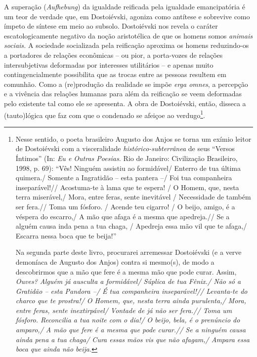 A superação (\emph{Aufhebung}) da igualdade reificada pela igualdade
emancipatória é um teor de verdade que, em Dostoiévski, agoniza como
antítese e sobrevive como ímpeto de síntese em meio ao subsolo.
Dostoiévski nos revela o caráter escatologicamente negativo da noção
aristotélica de que os homens somos \emph{animais sociais.} A sociedade
socializada pela reificação aproxima os homens reduzindo-os a portadores
de relações econômicas -- ou pior, a porta-vozes de relações
intersubjetivas deformadas por interesses utilitários -- e apenas muito
contingencialmente possibilita que as trocas entre as pessoas resultem
em comunhão. Como a (re)produção da realidade se impõe \emph{erga
omnes}, a percepção e a vivência das relações humanas para além da
reificação se veem deformadas pelo existente tal como ele se apresenta.
A obra de Dostoiévski, então, disseca a (tauto)lógica que faz com que o
condenado se afeiçoe ao verdugo\footnote{Nesse sentido, o poeta
  brasileiro Augusto dos Anjos se torna um exímio leitor de Dostoiévski
  com a visceralidade \emph{histórico-subterrânea} de seus ``Versos
  Íntimos'' (In: \emph{Eu e Outras Poesias.} Rio de Janeiro: Civilização
  Brasileiro, 1998, p. 69): ``Vês! Ninguém assistiu ao formidável/
  Enterro de tua última quimera./ Somente a Ingratidão -- esta pantera
  --/ Foi tua companheira inseparável!// Acostuma-te à lama que te
  espera! / O Homem, que, nesta terra miserável,/ Mora, entre feras,
  sente inevitável / Necessidade de também ser fera.// Toma um fósforo.
  / Acende teu cigarro! / O beijo, amigo, é a véspera do escarro,/ A mão
  que afaga é a mesma que apedreja.// Se a alguém causa inda pena a tua
  chaga, / Apedreja essa mão vil que te afaga,/ Escarra nessa boca que
  te beija!''

  Na segunda parte deste livro, procurarei arremessar Dostoiévski (e a
  verve demoníaca de Augusto dos Anjos) contra si mesmo(s), de modo a
  descobrirmos que a mão que fere é a mesma mão que pode curar. Assim,
  \emph{Ouves? Alguém já ausculta a formidável/ Súplica de tua Fênix./
  Não só a Gratidão -- esta Pandora --/ É tua companheira inseparável!//
  Levanta-te do charco que te prostra!/ O Homem, que, nesta terra ainda
  purulenta,/ Mora, entre feras, sente inextirpável/ Vontade de já não
  ser fera.// Toma um fósforo. Reconcilia a tua noite com o dia!/ O
  beijo, bela, é o prenúncio do amparo,/ A mão que fere é a mesma que
  pode curar.// Se a ninguém causa ainda pena a tua chaga/ Cura essas
  mãos vis que não afagam,/ Ampara essa boca que ainda não beija. }}.

